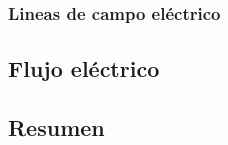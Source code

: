

\subsubsection{Lineas de campo eléctrico}



\subsection{Flujo eléctrico}






\subsection{Resumen}

